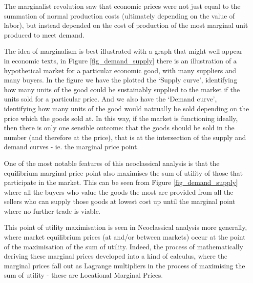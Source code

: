 \documentclass[
10pt, %
a4paper, %
oneside, %
headinclude,footinclude, %
BCOR5mm, %
]{scrartcl}
\begin{document}
The marginalist revolution saw that economic prices were not just equal to the summation of normal production costs (ultimately depending on the value of labor), but instead depended on the cost of production of the most marginal unit produced to meet demand.

The idea of marginalism is best illustrated with a graph that might well appear in economic texts, in Figure \ref{fig_demand_supply} there is an illustration of a hypothetical market for a particular economic good, with many suppliers and many buyers.
In the figure we have the plotted the `Supply curve', identifying how many units of the good could be sustainably supplied to the market if the units sold for a particular price.
And we also have the `Demand curve', identifying how many units of the good would natrually be sold depending on the price which the goods sold at.
In this way, if the market is functioning ideally, then there is only one sensible outcome: that the goods should be sold in the number (and therefore at the price), that is at the intersection of the supply and demand curves - ie. the marginal price point.

One of the most notable features of this neoclassical analysis is that the equilibrium marginal price point also maximises the sum of utility of those that participate in the market.
This can be seen from Figure \ref{fig_demand_supply} where all the buyers who value the goods the most are provided from all the sellers who can supply those goods at lowest cost up until the marginal point where no further trade is viable.

This point of utility maximisation is seen in Neoclassical analysis more generally, where market equilibrium prices (at and/or between markets) occur at the point of the maximisation of the sum of utility. Indeed, the process of mathematically deriving these marginal prices developed into a kind of calculus, where the marginal prices fall out as Lagrange multipliers in the process of maximising the sum of utility - these are Locational Marginal Prices.
\end{document}
